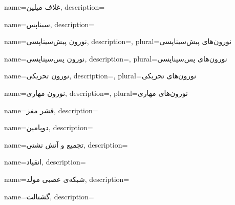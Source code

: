 {
	name={غلاف میلین},
	description=\hfill{}
}

{
	name={سیناپس},
	description=\hfill{}
}

{
	name={نورون پیش‌سیناپسی},
	description=\hfill{},
    plural={نورون‌های پیش‌سیناپسی}
}

{
	name={نورون پس‌سیناپسی},
	description=\hfill{},
    plural={نورون‌های پس‌سیناپسی}
}

{
	name={نورون تحریکی},
	description=\hfill{},
    plural={نورون‌های تحریکی}
}

{
	name={نورون مهاری},
	description=\hfill{},
    plural={نورون‌های مهاری}
}

{
	name={قشر مغز},
	description=\hfill{}
}

{
    name={دوپامین},
    description=\hfill{}
}

{
    name={تجمیع و آتش نشتی},
    description=\hfill{}
}


{
	name={انقیاد},
	description=\hfill{}
}

{
name={شبکه‌ی عصبی مولد},
description=\hfill{}
}

{
	name={گشتالت},
	description=\hfill{}
}


